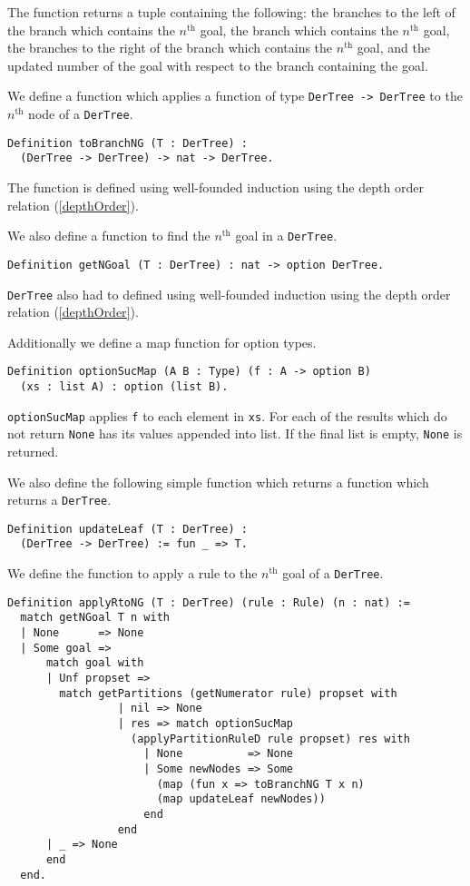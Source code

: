 \documentclass{llncs}
\begin{document}
The function returns a tuple containing the following: the branches to the left
of the branch which contains the $n^{\textrm{th}}$ goal, the branch which
contains the $n^{\textrm{th}}$ goal, the branches to the right of the branch
which contains the $n^{\textrm{th}}$ goal, and the updated number of the goal
with respect to the branch containing the goal.

We define a function which applies a function of type
\verb+DerTree -> DerTree+ to the $n^{\textrm{th}}$ node of a \verb+DerTree+.

\begin{verbatim}
Definition toBranchNG (T : DerTree) :
  (DerTree -> DerTree) -> nat -> DerTree.
\end{verbatim}

The function is defined using well-founded induction using the depth order
relation (\ref{depthOrder}).

We also define a function to find the $n^{\textrm{th}}$ goal in a
\verb+DerTree+.

\begin{verbatim}
Definition getNGoal (T : DerTree) : nat -> option DerTree.
\end{verbatim}

\verb+DerTree+ also had to defined using well-founded induction using the
depth order relation (\ref{depthOrder}).

Additionally we define a map function for option types.

\begin{verbatim}
Definition optionSucMap (A B : Type) (f : A -> option B)
  (xs : list A) : option (list B).
\end{verbatim}

\verb+optionSucMap+ applies \verb+f+ to each element in \verb+xs+. For each of
the results which do not return \verb+None+ has its values appended into list.
If the final list is empty, \verb+None+ is returned.

We also define the following simple function which returns a function which
returns a \verb+DerTree+.

\begin{verbatim}
Definition updateLeaf (T : DerTree) :
  (DerTree -> DerTree) := fun _ => T.
\end{verbatim}

We define the function to apply a rule to the $n^{\textrm{th}}$ goal of a
\verb+DerTree+.

\begin{verbatim}
Definition applyRtoNG (T : DerTree) (rule : Rule) (n : nat) :=
  match getNGoal T n with
  | None      => None
  | Some goal => 
      match goal with
      | Unf propset =>
        match getPartitions (getNumerator rule) propset with
                 | nil => None
                 | res => match optionSucMap
                   (applyPartitionRuleD rule propset) res with
                     | None          => None
                     | Some newNodes => Some
                       (map (fun x => toBranchNG T x n)
                       (map updateLeaf newNodes))
                     end
                 end
      | _ => None
      end
  end.
\end{verbatim}
\end{document}
